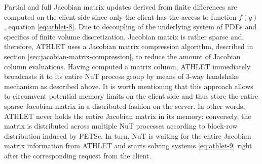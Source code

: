 Partial and full Jacobian matrix updates derived from finite differences are computed on the client side since only the client has the access to function $f(y)$, equation \ref{eq:athlet-8}. Due to decoupling of the underlying system of PDEs and specifics of finite volume discretization, Jacobian matrix is rather sparse and, therefore, ATHLET uses a Jacobian matrix compression algorithm, described in section \ref{sec:jacobian-matrix-compression}, to reduce the amount of Jacobian column evaluations. Having computed a matrix column, ATHLET immediately broadcasts it to its entire NuT process group by means of 3-way handshake mechanism as described above. It is worth mentioning that this approach allows to circumvent potential memory limits on the client side and thus store the entire sparse Jacobian matrix in a distributed fashion on the server. In other words, ATHLET never holds the entire Jacobian matrix in its memory; conversely, the matrix is distributed across multiple NuT processes according to block-row distribution induced by PETSc. In turn, NuT is waiting for the entire Jacobian matrix information from ATHLET and starts solving systems \ref{eq:athlet-9} right after the corresponding request from the client.\\


